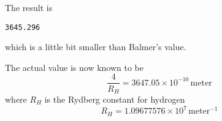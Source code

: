 \documentclass[12pt]{article}
\begin{document}
\medskip
\noindent
The result is
{\footnotesize
\begin{verbatim}
3645.296
\end{verbatim}
}

\noindent
which is a little bit smaller than Balmer's value.

\bigskip
\noindent
The actual value is now known to be
\begin{equation*}
\frac{4}{R_H}=3647.05\times10^{-10}\,\text{meter}
\end{equation*}
where $R_H$ is the Rydberg constant for hydrogen
\begin{equation*}
R_H=1.09677576\times10^7\,\text{meter}^{-1}
\end{equation*}
\end{document}
